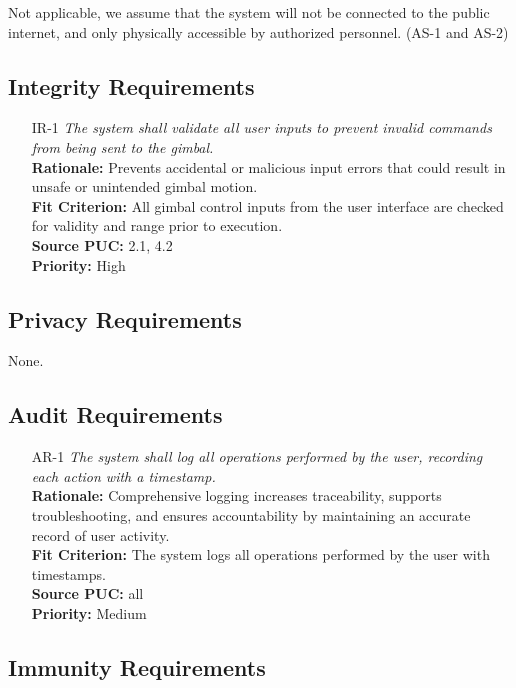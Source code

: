 \documentclass[12pt]{article}
\begin{document}
Not applicable, we assume that the system will not be connected to the public
internet, and only physically accessible by authorized personnel. (AS-1 and
AS-2)

\subsection{Integrity Requirements}
\begin{itemize}[leftmargin=*]
  \item[IR-1] \emph{The system shall validate all user inputs to prevent invalid
          commands from being sent to the gimbal.}\\[2mm]
        \textbf{Rationale:} Prevents accidental or malicious input errors that could result in unsafe or unintended gimbal motion.\\
        \textbf{Fit Criterion:} All gimbal control inputs from the user interface are checked for validity and range prior to execution.\\
        \textbf{Source PUC:} 2.1, 4.2 \\
        \textbf{Priority:} High
\end{itemize}

\subsection{Privacy Requirements}

None.

\subsection{Audit Requirements}
\begin{itemize}[leftmargin=*]
  \item[AR-1] \emph{The system shall log all operations performed by the user,
          recording each action with a timestamp.}\\[2mm]
        \textbf{Rationale:} Comprehensive logging increases traceability, supports troubleshooting, and ensures accountability by maintaining an accurate record of user activity.\\
        \textbf{Fit Criterion:} The system logs all operations performed by the user with timestamps.\\
        \textbf{Source PUC:} all \\
        \textbf{Priority:} Medium
\end{itemize}

\subsection{Immunity Requirements}
\end{document}
